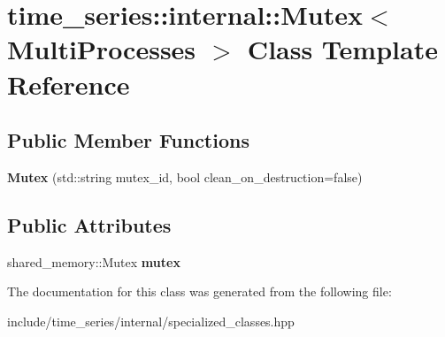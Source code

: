 \hypertarget{classtime__series_1_1internal_1_1Mutex_3_01MultiProcesses_01_4}{}\section{time\+\_\+series\+:\+:internal\+:\+:Mutex$<$ Multi\+Processes $>$ Class Template Reference}
\label{classtime__series_1_1internal_1_1Mutex_3_01MultiProcesses_01_4}
\subsection*{Public Member Functions}
\begin{DoxyCompactItemize}
\item 
\mbox{\label{classtime__series_1_1internal_1_1Mutex_3_01MultiProcesses_01_4_af419ba3f8e8d32545934adc61b2c5912}} 
{\bfseries Mutex} (std\+::string mutex\+\_\+id, bool clean\+\_\+on\+\_\+destruction=false)
\end{DoxyCompactItemize}
\subsection*{Public Attributes}
\begin{DoxyCompactItemize}
\item 
\mbox{\label{classtime__series_1_1internal_1_1Mutex_3_01MultiProcesses_01_4_a1e95015e916cf7bc892fcce0f05be705}} 
shared\+\_\+memory\+::\+Mutex {\bfseries mutex}
\end{DoxyCompactItemize}


The documentation for this class was generated from the following file\+:\begin{DoxyCompactItemize}
\item 
include/time\+\_\+series/internal/specialized\+\_\+classes.\+hpp\end{DoxyCompactItemize}
